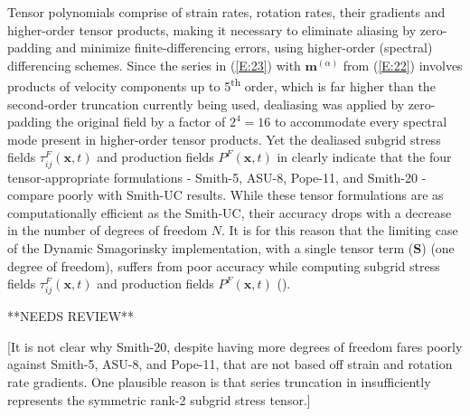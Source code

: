 % 
Tensor polynomials comprise of strain rates, rotation rates, their gradients and higher-order tensor products, making it necessary to eliminate aliasing by zero-padding and minimize finite-differencing errors, using higher-order (spectral) differencing schemes. 
%
Since the series in (\ref{E:23}) with  $\mathbf{m}^{(\alpha)}$ from (\ref{E:22}) involves products of velocity components up to 5\textsuperscript{th} order, which is far higher than the second-order truncation currently being used, dealiasing was applied by zero-padding the original field by a factor of $2^4 = 16$ to accommodate every spectral mode present in higher-order tensor products.   
%
%
%
Yet the dealiased subgrid stress fields  $\tau_{ij}^{F}(\mathbf{x},t)$ and production fields $P^{F}(\mathbf{x},t)$ in  clearly indicate that the four tensor-appropriate formulations - Smith-5, ASU-8, Pope-11, and Smith-20 - compare poorly with Smith-UC results. 
%
While these tensor formulations are as computationally efficient as the Smith-UC, their accuracy drops with a decrease in the number of degrees of freedom $N$.
%
%
It is for this reason that the limiting case of the Dynamic Smagorinsky implementation, with a single tensor term ($\mathbf{S}$) (one degree of freedom), suffers from poor accuracy while computing subgrid stress fields $\tau_{ij}^{F}(\mathbf{x},t)$ and production fields $P^{F}(\mathbf{x},t)$ ().
%

%
**NEEDS REVIEW**

[It is not clear why Smith-20, despite having more degrees of freedom fares poorly against  Smith-5, ASU-8, and Pope-11, that are not based off strain and rotation rate gradients. One plausible reason is that series truncation in  insufficiently represents the symmetric rank-2 subgrid stress tensor.]



